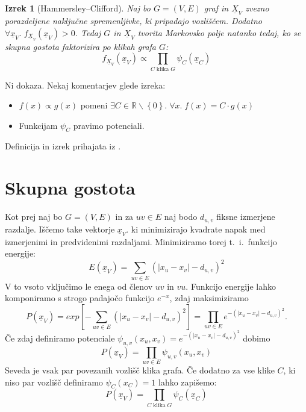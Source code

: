 \documentclass[a4paper]{article}
\newtheorem{theorem}[definition]{Izrek}
\begin{document}
	\begin{samepage}
		\begin{theorem}[Hammersley–Clifford]
			Naj bo $G = \left(V, E\right)$ graf in $\underline{X}_V$ zvezno porazdeljene naključne spremenljivke, ki pripadajo vozliščem.
			Dodatno $\forall \underline{x}_V.\;f_{\underline{X}_V}\left(\underline{x}_V\right) > 0$.
			Tedaj $G$ in $\underline{X}_V$ tvorita Markovsko polje natanko tedaj,
			ko se skupna gostota faktorizira po klikah grafa $G$:
			$$f_{\underline{X}_V}\left(\underline{x}_V\right) \propto
			\prod_{C\;\text{klika}\;G}\psi_C\left(\underline{x}_C\right)$$
		\end{theorem}

		Ni dokaza. Nekaj komentarjev glede izreka:
		\begin{itemize}
			\item $f\left(x\right) \propto g\left(x\right)$ pomeni
			$\exists C \in \mathbb{R}\backslash\left\{0\right\}.\;\forall x.\;f\left(x\right) = C\cdot g\left(x\right)$
			\item Funkcijam $\psi_C$ pravimo potenciali.
		\end{itemize}
	Definicija in izrek prihajata iz \cite{Bishop}.
	\end{samepage}

	\section{Skupna gostota}
	Kot prej naj bo $G = \left(V, E\right)$ in za $uv \in E$ naj bodo
	$d_{u,v}$ fiksne izmerjene razdalje.
	Iščemo take vektorje $\underline{x}_V$.
	ki minimizirajo kvadrate napak med izmerjenimi in predvidenimi razdaljami.
	Minimiziramo torej t.~i.\ funkcijo energije:
	$$E\left(\underline{x}_V\right) = \sum_{uv \in E}\left(\left|x_u - x_v\right|-d_{u,v}\right)^2$$
	V to vsoto vključimo le enega od členov $uv$ in $vu$. Funkcijo energije lahko komponiramo s strogo padajočo funkcijo $e^{-x}$, zdaj maksimiziramo
	$$P\left(\underline{x}_V\right) = exp\left[-\sum_{uv \in E}\left(\left|x_u - x_v\right|-d_{u,v}\right)^2\right] =
	\prod_{uv \in E}e^{-\left(\left|x_u - x_v\right|-d_{u,v}\right)^2}.$$
	Če zdaj definiramo potenciale
	$\psi_{u,v}\left(x_u, x_v\right) = e^{-\left(\left|x_u - x_v\right|-d_{u,v}\right)^2}$ dobimo
	$$P\left(\underline{x}_V\right) = \prod_{uv \in E}\psi_{u,v}\left(x_u, x_v\right)$$
	Seveda je vsak par povezanih vozlišč klika grafa. Če dodatno za vse klike
	$C$, ki niso par vozlišč definiramo $\psi_C\left(x_C\right) = 1$ lahko zapišemo:
	$$P\left(\underline{x}_V\right) = \prod_{C\;\text{klika}\;G}\psi_C\left(\underline{x}_C\right)$$
\end{document}
